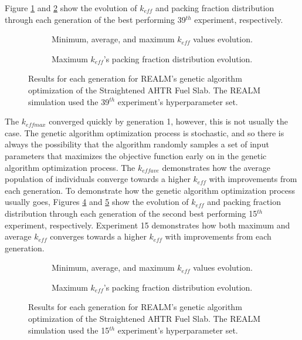 Figure \ref{fig:keff_conv_39} and \ref{fig:pf_39} show the evolution of $k_{eff}$ 
and packing fraction distribution through each generation of the best performing 
39$^{th}$ experiment, respectively. 
\begin{figure}[]
    \centering
    \begin{subfigure}{\textwidth}
    \caption{Minimum, average, and maximum $k_{eff}$ values evolution.}
    \label{fig:keff_conv_39}
    \end{subfigure}
    \begin{subfigure}{\textwidth}
        \caption{Maximum $k_{eff}$'s packing fraction distribution evolution.}
        \label{fig:pf_39}
    \end{subfigure}
    \caption{ Results for each generation for \gls{REALM}'s genetic algorithm optimization 
    of the Straightened \acrfull{AHTR} Fuel Slab. The \gls{REALM} simulation used 
    the 39$^{th}$ experiment's hyperparameter set.}
    \label{fig:39}
\end{figure}
The $k_{eff max}$ converged quickly by generation 1, however, this is not 
usually the case. 
The genetic algorithm optimization process is stochastic, and so there is always 
the possibility that the algorithm randomly samples a set of input parameters
that maximizes the objective function early on in the genetic algorithm 
optimization process. 
The $k_{eff ave}$ demonstrates how the average population of individuals converge 
towards a higher $k_{eff}$ with improvements from each generation. 
To demonstrate how the genetic algorithm optimization process usually goes, 
Figures \ref{fig:keff_conv_15} and \ref{fig:pf_15} show the evolution of $k_{eff}$ 
and packing fraction distribution through each generation of the second best 
performing 15$^{th}$ experiment, respectively. 
Experiment 15 demonstrates how both maximum and average $k_{eff}$ converges 
towards a higher $k_{eff}$ with improvements from each generation.
\begin{figure}[]
    \centering
    \begin{subfigure}{\textwidth}
    \caption{Minimum, average, and maximum $k_{eff}$ values evolution.}
    \label{fig:keff_conv_15}
    \end{subfigure}
    \begin{subfigure}{\textwidth}
        \caption{Maximum $k_{eff}$'s packing fraction distribution evolution.}
        \label{fig:pf_15}
    \end{subfigure}
    \caption{ Results for each generation for \gls{REALM}'s genetic algorithm optimization 
    of the Straightened \acrfull{AHTR} Fuel Slab. The \gls{REALM} simulation used 
    the 15$^{th}$ experiment's hyperparameter set.}
    \label{fig:15}
\end{figure}

